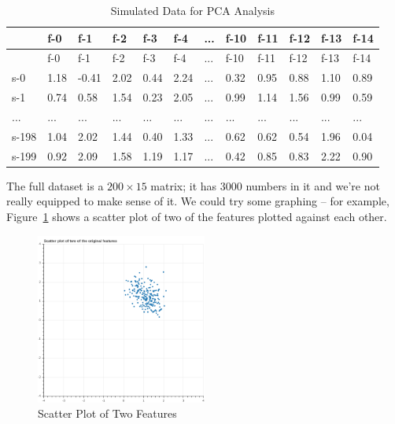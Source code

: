 \documentclass[
  11pt,
  letterpaper,
]{scrbook}
\theoremstyle{plain}
\theoremstyle{plain}
\theoremstyle{remark}
\begin{document}
\hypertarget{tbl-rawdata}{}
\begin{longtable}[]{@{}llllllllllll@{}}
\caption{\label{tbl-rawdata}Simulated Data for PCA
Analysis}\tabularnewline
\toprule()
& f-0 & f-1 & f-2 & f-3 & f-4 & ... & f-10 & f-11 & f-12 & f-13 &
f-14 \\
\midrule()
\endfirsthead
\toprule()
& f-0 & f-1 & f-2 & f-3 & f-4 & ... & f-10 & f-11 & f-12 & f-13 &
f-14 \\
\midrule()
\endhead
s-0 & 1.18 & -0.41 & 2.02 & 0.44 & 2.24 & ... & 0.32 & 0.95 & 0.88 &
1.10 & 0.89 \\
s-1 & 0.74 & 0.58 & 1.54 & 0.23 & 2.05 & ... & 0.99 & 1.14 & 1.56 & 0.99
& 0.59 \\
... & ... & ... & ... & ... & ... & ... & ... & ... & ... & ... & ... \\
s-198 & 1.04 & 2.02 & 1.44 & 0.40 & 1.33 & ... & 0.62 & 0.62 & 0.54 &
1.96 & 0.04 \\
s-199 & 0.92 & 2.09 & 1.58 & 1.19 & 1.17 & ... & 0.42 & 0.85 & 0.83 &
2.22 & 0.90 \\
\bottomrule()
\end{longtable}

The full dataset is a \(200\times 15\) matrix; it has \(3000\) numbers
in it and we're not really equipped to make sense of it. We could try
some graphing -- for example, Figure~\ref{fig-features} shows a scatter
plot of two of the features plotted against each other.

\begin{figure}

{\centering \includegraphics[width=0.5\textwidth,height=\textheight]{chapters/img/features.png}

}

\caption{\label{fig-features}Scatter Plot of Two Features}

\end{figure}
\end{document}
